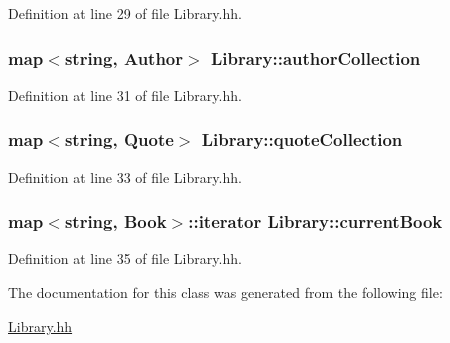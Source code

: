 Definition at line 29 of file Library.\+hh.

\hypertarget{class_library_a7a6958a0dc85a1c816ca35727306cd62}{
\subsubsection[{author\+Collection}]{\setlength{\rightskip}{0pt plus 5cm}map$<$string, {\bf Author}$>$ Library\+::author\+Collection\hspace{0.3cm}{\ttfamily [private]}}}\label{class_library_a7a6958a0dc85a1c816ca35727306cd62}


Definition at line 31 of file Library.\+hh.

\hypertarget{class_library_a84be5207332f4b2456af95907d0a43b5}{
\subsubsection[{quote\+Collection}]{\setlength{\rightskip}{0pt plus 5cm}map$<$string, {\bf Quote}$>$ Library\+::quote\+Collection\hspace{0.3cm}{\ttfamily [private]}}}\label{class_library_a84be5207332f4b2456af95907d0a43b5}


Definition at line 33 of file Library.\+hh.

\hypertarget{class_library_a78a4071e8d610da671b3886c71900dae}{
\subsubsection[{current\+Book}]{\setlength{\rightskip}{0pt plus 5cm}map$<$string, {\bf Book}$>$\+::iterator Library\+::current\+Book\hspace{0.3cm}{\ttfamily [private]}}}\label{class_library_a78a4071e8d610da671b3886c71900dae}


Definition at line 35 of file Library.\+hh.



The documentation for this class was generated from the following file\+:\begin{DoxyCompactItemize}
\item 
\hyperlink{_library_8hh}{Library.\+hh}\end{DoxyCompactItemize}
